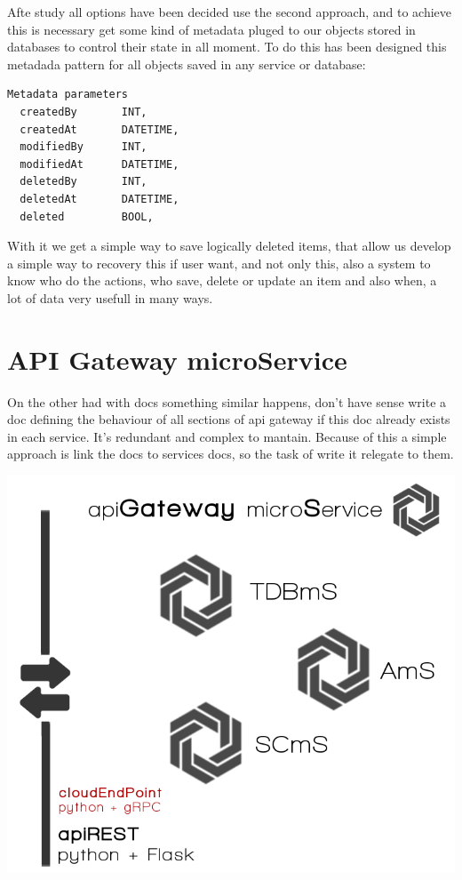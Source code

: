 \noindent Afte study all options have been decided use the second approach, and to achieve
this is necessary get some kind of metadata pluged to our objects stored in databases
to control their state in all moment.
To do this has been designed this metadada pattern for all objects saved in any
service or database:

\begin{lstlisting}[language=python,frame=none]
  Metadata parameters
  createdBy       INT,
  createdAt       DATETIME,
  modifiedBy      INT,
  modifiedAt      DATETIME,
  deletedBy       INT,
  deletedAt       DATETIME,
  deleted         BOOL,

\end{lstlisting}

With it we get a simple way to save logically deleted items, that allow us
develop a simple way to recovery this if user want, and not only this, also
a system to know who do the actions, who save, delete or update an item and
also when, a lot of data very usefull in many ways.


\section{API Gateway microService}

On the other had with docs something similar happens, don't have sense
write a doc defining the behaviour of all sections of api gateway
if this doc already exists in each service. It's redundant and complex
to mantain. Because of this a simple approach is link the docs to
services docs, so the task of write it relegate to them.


\begin{center}
\includegraphics[scale=0.35]{img/graphics/apigateway.png}
\end{center}

